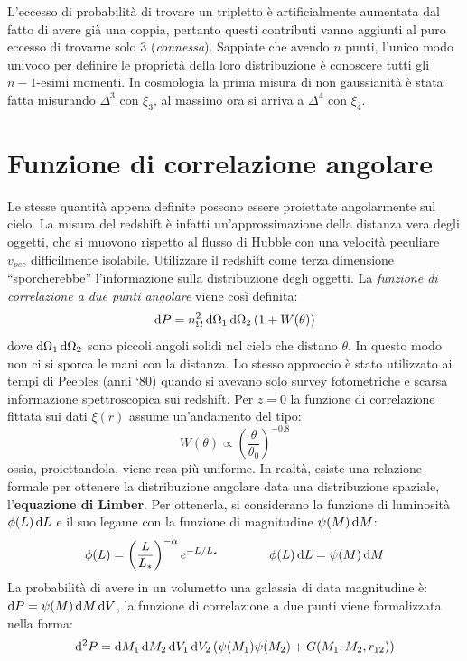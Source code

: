 L'eccesso di probabilità di trovare un tripletto è artificialmente aumentata dal fatto di avere già una coppia, pertanto questi contributi vanno aggiunti al puro eccesso di trovarne solo 3 (\textit{connessa}). Sappiate che avendo $n$ punti, l'unico modo univoco per definire le proprietà della loro distribuzione è conoscere tutti gli $n-1$-esimi momenti. In cosmologia la prima misura di non gaussianità è stata fatta misurando $\Delta^3$ con  $\xi_3$, al massimo ora si arriva a $\Delta^4$ con  $\xi_4$.

\section{Funzione di correlazione angolare}
Le stesse quantità appena definite possono essere proiettate angolarmente sul cielo. La misura del redshift è infatti un'approssimazione della distanza vera degli oggetti, che si muovono rispetto al flusso di Hubble con una velocità peculiare $v_{pec}$ difficilmente isolabile. Utilizzare il redshift come terza dimensione ``sporcherebbe'' l'informazione sulla distribuzione degli oggetti. La \textit{funzione di correlazione a due punti angolare} viene così definita:
\begin{equation}
    \operatorname{d}\!{P}=n_\Omega^2 \operatorname{d}\!{\Omega_1}\operatorname{d}\!{\Omega_2}\left( 1+W(\theta)\right)
\end{equation}
dove $\operatorname{d}\!{\Omega_1}\operatorname{d}\!{\Omega_2}$ sono piccoli angoli solidi nel cielo che distano $\theta$. In questo modo non ci si sporca le mani con la distanza. Lo stesso approccio è stato utilizzato ai tempi di Peebles (anni `80) quando si avevano solo survey fotometriche e scarsa informazione spettroscopica sui redshift. Per $z=0$ la funzione di correlazione fittata sui dati $\xi(r)$ assume un'andamento del tipo:
$$
W(\theta)\propto \left(\frac{\theta}{\theta_0}\right)^{-0.8}
$$
ossia, proiettandola, viene resa più uniforme. In realtà, esiste una relazione formale per ottenere la distribuzione angolare data una distribuzione spaziale, l'\textbf{equazione di Limber}. Per ottenerla, si considerano la funzione di luminosità $\phi (L) \operatorname{d}\!{L}$ e il suo legame con la funzione di magnitudine $\psi (M) \operatorname{d}\!{M}$:
\begin{equation}
    \phi (L) = \left(\frac{L}{L_*}\right)^{-\alpha}e^{-L/L_*} \qquad\qquad \phi (L) \operatorname{d}\!{L}=\psi (M) \operatorname{d}\!{M}
\end{equation}
La probabilità di avere in un volumetto una galassia di data magnitudine è: $\operatorname{d}\!{P}=\psi (M) \operatorname{d}\!{M}\operatorname{d}\!{V}$, la funzione di correlazione a due punti viene formalizzata nella forma:
\begin{equation}
    \operatorname{d}\!{^2P}=\operatorname{d}\!{M_1}\operatorname{d}\!{M_2}\operatorname{d}\!{V_1}\operatorname{d}\!{V_2} \left(\psi (M_1)\psi (M_2) + G(M_1, M_2, r_{12})\right)
\end{equation}
